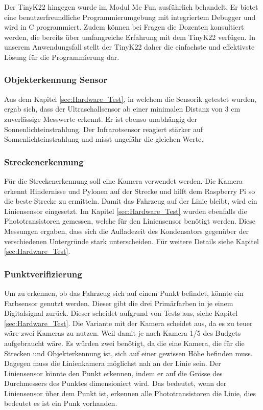 \documentclass[../main.tex]{subfiles}
\begin{document}
    Der TinyK22 hingegen wurde im Modul Mc Fun ausführlich behandelt. Er bietet eine benutzerfreundliche Programmierumgebung mit integriertem Debugger und wird in C programmiert. Zudem können bei Fragen die Dozenten konsultiert werden, die bereits über umfangreiche Erfahrung mit dem TinyK22 verfügen. In unserem Anwendungsfall stellt der TinyK22 daher die einfachste und effektivste Lösung für die Programmierung dar.


\subsubsection{Objekterkennung Sensor}
\label{a3:Objekterkennung_Sensor}
 Aus dem Kapitel \ref{sec:Hardware_Test}, in welchem die Sensorik getestet wurden, ergab sich, dass der Ultraschallsensor ab einer minimalen Distanz von 3 cm zuverlässige Messwerte erkennt. Er ist ebenso unabhängig der Sonnenlichteinstrahlung. Der Infrarotsensor reagiert stärker auf Sonnenlichteinstrahlung und misst ungefähr die gleichen Werte. 



\subsubsection{Streckenerkennung}
Für die Streckenerkennung soll eine Kamera verwendet werden. Die Kamera erkennt Hindernisse und Pylonen auf der Strecke und hilft dem Raspberry Pi so die beste Strecke zu ermitteln. Damit das Fahrzeug auf der Linie bleibt, wird ein Liniensensor eingesetzt.  Im Kapitel \ref{sec:Hardware_Test} wurden ebenfalls die Phototransistoren gemessen, welche für den Liniensensor benötigt werden. Diese Messungen ergaben, dass sich die Aufladezeit des Kondensators gegenüber der verschiedenen Untergründe stark unterscheiden. Für weitere Details siehe Kapitel \ref{sec:Hardware_Test}. 

\subsubsection{Punktverifizierung}
Um zu erkennen, ob das Fahrzeug sich auf einem Punkt befindet, könnte ein Farbsensor genutzt werden. Dieser gibt die drei Primärfarben in je einem Digitalsignal zurück. Dieser scheidet aufgrund von Tests aus, siehe Kapitel \ref{sec:Hardware_Test}. Die Variante mit der Kamera scheidet aus, da es zu teuer wäre zwei Kameras zu nutzen. Weil damit je nach Kamera 1/5 des Budgets aufgebraucht wäre. Es würden zwei benötigt, da die eine Kamera, die für die Strecken und Objekterkennung ist, sich auf einer gewissen Höhe befinden muss. Dagegen muss die Linienkamera möglichst nah an der Linie sein.
Der Liniensensor könnte den Punkt erkennen, indem er auf die Grösse des Durchmessers des Punktes dimensioniert wird. Das bedeutet, wenn der Liniensensor über dem Punkt ist, erkennen alle Phototransistoren die Linie, dies bedeutet es ist ein Punk vorhanden. 
\end{document}
